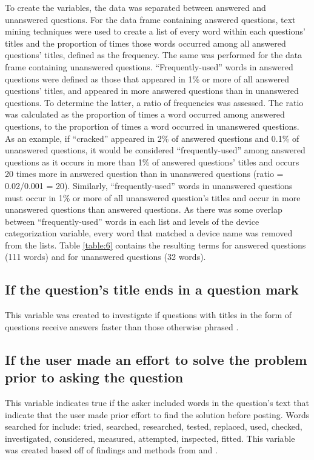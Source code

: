 \documentclass[]{interact}\usepackage[]{graphicx}\usepackage[]{color}
\begin{document}
To create the variables, the data was separated between answered and unanswered questions. For the data frame containing answered questions, text mining techniques were used to create a list of every word within each questions' titles and the proportion of times those words occurred among all answered questions' titles, defined as the frequency. The same was performed for the data frame containing unanswered questions. ``Frequently-used'' words in answered questions were defined as those that appeared in 1\% or more of all answered questions' titles, and appeared in more answered questions than in unanswered questions. To determine the latter, a ratio of frequencies was assessed. The ratio was calculated as the proportion of times a word occurred among answered questions, to the proportion of times a word occurred in unanswered questions. As an example, if ``cracked'' appeared in 2\% of answered questions and 0.1\% of unanswered questions, it would be considered ``frequently-used'' among answered questions as it occurs in more than 1\% of answered questions' titles and occurs 20 times more in answered question than in unanswered questions (ratio = 0.02/0.001 = 20). Similarly, ``frequently-used'' words in unanswered questions must occur in 1\% or more of all unanswered question's titles and occur in more unanswered questions than answered questions. As there was some overlap between ``frequently-used'' words in each list and levels of the device categorization variable, every word that matched a device name was removed from the lists. Table \ref{table:6} contains the resulting terms for answered questions (111 words) and for unanswered questions (32 words).

\subsection{If the question's title ends in a question mark}

This variable was created to investigate if questions with titles in the form of questions receive answers faster than those otherwise phrased \cite{Bhat2014}. 


\subsection{If the user made an effort to solve the problem prior to asking the question}

This variable indicates true if the asker included words in the question's text that indicate that the user made prior effort to find the solution before posting. Words searched for include: tried, searched, researched, tested, replaced, used, checked, investigated, considered, measured, attempted, inspected, fitted. This variable was created based off of findings and methods from \cite{Bhat2014} and \cite{Harper2008}. 
\end{document}
